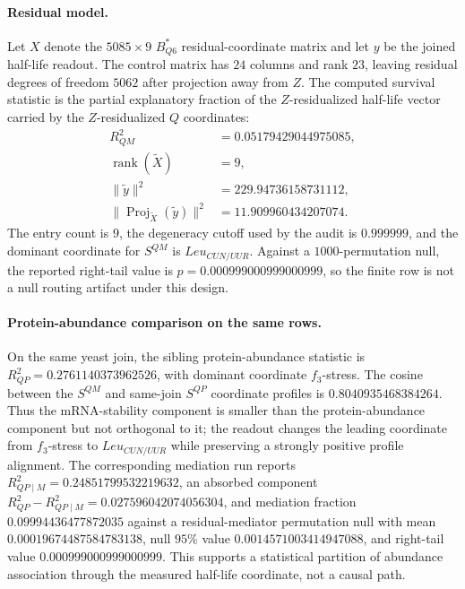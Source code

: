 \paragraph{Residual model.}
Let $X$ denote the $5085 \times 9$ $B^{\ast}_{Q6}$ residual-coordinate matrix and let $y$ be the joined half-life readout.  The control matrix has $24$ columns and rank $23$, leaving residual degrees of freedom $5062$ after projection away from $Z$.  The computed survival statistic is the partial explanatory fraction of the $Z$-residualized half-life vector carried by the $Z$-residualized $Q$ coordinates:
$$
\begin{aligned}
R^2_{QM} &= 0.05179429044975085,\\
\operatorname{rank}(\widetilde X) &= 9,\\
\|\widetilde y\|^2 &= 229.94736158731112,\\
\|\operatorname{Proj}_{\widetilde X}(\widetilde y)\|^2 &= 11.909960434207074.
\end{aligned}
$$
The entry count is $9$, the degeneracy cutoff used by the audit is $0.999999$, and the dominant coordinate for $S^{QM}$ is $Leu_{CUN/UUR}$.  Against a $1000$-permutation null, the reported right-tail value is $p=0.000999000999000999$, so the finite row is not a null routing artifact under this design.

\paragraph{Protein-abundance comparison on the same rows.}
On the same yeast join, the sibling protein-abundance statistic is $R^2_{QP}=0.2761140373962526$, with dominant coordinate $f_3$-stress.  The cosine between the $S^{QM}$ and same-join $S^{QP}$ coordinate profiles is $0.8040935468384264$.  Thus the mRNA-stability component is smaller than the protein-abundance component but not orthogonal to it; the readout changes the leading coordinate from $f_3$-stress to $Leu_{CUN/UUR}$ while preserving a strongly positive profile alignment.  The corresponding mediation run reports $R^2_{QP\mid M}=0.24851799532219632$, an absorbed component $R^2_{QP}-R^2_{QP\mid M}=0.027596042074056304$, and mediation fraction $0.09994436477872035$ against a residual-mediator permutation null with mean $0.00019674487584783138$, null $95\%$ value $0.0014571003414947088$, and right-tail value $0.000999000999000999$.  This supports a statistical partition of abundance association through the measured half-life coordinate, not a causal path.


